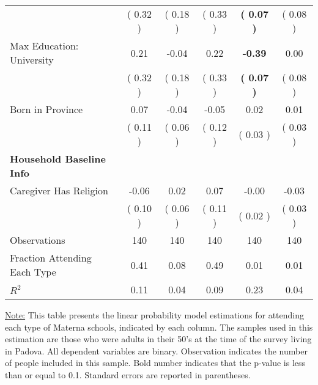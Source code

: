 \begin{table}[H]
{\begin{tabular}{lccccc}
\quad  & (     0.32 ) & (     0.18 )  & (     0.33 )  & \textbf{(     0.07 )} & (     0.08 ) \\
\quad Max Education: University &      0.21 &     -0.04 &      0.22 & \textbf{    -0.39} &      0.00 \\
\quad  & (     0.32 ) & (     0.18 )  & (     0.33 )  & \textbf{(     0.07 )} & (     0.08 ) \\
\quad Born in Province &      0.07 &     -0.04 &     -0.05 &      0.02 &      0.01 \\
\quad  & (     0.11 ) & (     0.06 )  & (     0.12 )  & (     0.03 ) & (     0.03 ) \\
\midrule
\textbf{Household Baseline Info} \\
\quad Caregiver Has Religion &     -0.06 &      0.02 &      0.07 &     -0.00 &     -0.03 \\
\quad  & (     0.10 ) & (     0.06 )  & (     0.11 )  & (     0.02 ) & (     0.03 ) \\
\midrule
Observations & 140 & 140 & 140 & 140 & 140 \\
Fraction Attending Each Type &      0.41 &      0.08 &      0.49 &      0.01 &      0.01 \\
\midrule
$ R^2$ &      0.11 &      0.04 &      0.09 &      0.23 &      0.04 \\
\bottomrule
\end{tabular}}
\end{table}
\begin{scriptsize}
\noindent\underline{Note:} This table presents the linear probability model estimations for attending each type of Materna schools, indicated by each column. The samples used in this estimation are those who were adults in their 50's at the time of the survey living in Padova. All dependent variables are binary. Observation indicates the number of people included in this sample. Bold number indicates that the p-value is less than or equal to 0.1. Standard errors are reported in parentheses.
\end{scriptsize}

